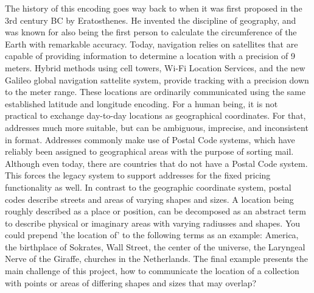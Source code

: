 The history of this encoding goes way back to when it was first proposed in the 3rd century BC by Eratosthenes. He invented the discipline of geography, and was known for also being the first person to calculate the circumference of the Earth with remarkable accuracy. Today, navigation relies on satellites that are capable of providing information to determine a location with a precision of 9 meters. Hybrid methods using cell towers, Wi-Fi Location Services, and the new Galileo global navigation sattelite system, provide tracking with a precision down to the meter range. These locations are ordinarily communicated using the same established latitude and longitude encoding. For a human being, it is not practical to exchange day-to-day locations as geographical coordinates. For that, addresses much more suitable, but can be ambiguous, imprecise, and inconsistent in format. Addresses commonly make use of Postal Code systems, which have reliably been assigned to geographical areas with the purpose of sorting mail. Although even today, there are countries that do not have a Postal Code system. This forces the legacy system to support addresses for the fixed pricing functionality as well. In contrast to the geographic coordinate system, postal codes describe streets and areas of varying shapes and sizes. A location being roughly described as a place or position, can be decomposed as an abstract term to describe physical or imaginary areas with varying radiusses and shapes. You could prepend 'the location of' to the following terms as an example: America, the birthplace of Sokrates, Wall Street, the center of the universe, the Laryngeal Nerve of the Giraffe, churches in the Netherlands. The final example presents the main challenge of this project, how to communicate the location of a collection with points or areas of differing shapes and sizes that may overlap?

%
